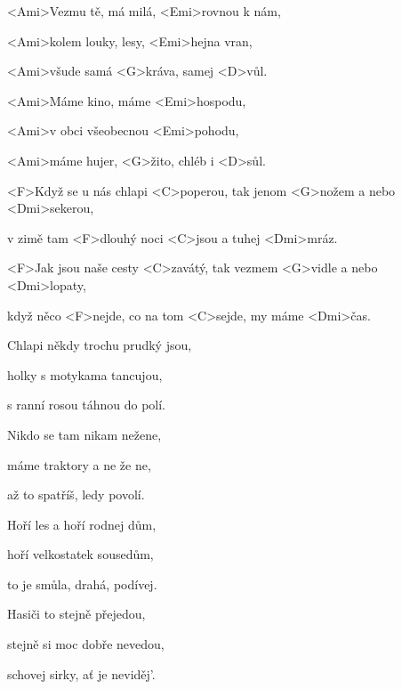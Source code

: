 

\zs
<Ami>Vezmu tě, má milá, <Emi>rovnou k nám,

<Ami>kolem louky, lesy, <Emi>hejna vran,

<Ami>všude samá <G>kráva, samej <D>vůl.

<Ami>Máme kino, máme <Emi>hospodu,

<Ami>v obci všeobecnou <Emi>pohodu,

<Ami>máme hujer, <G>žito, chléb i <D>sůl.
\ks

\zr
<F>Když se u nás chlapi <C>poperou, tak jenom <G>nožem a nebo <Dmi>sekerou,

v zimě tam <F>dlouhý noci <C>jsou a tuhej <Dmi>mráz.

<F>Jak jsou naše cesty <C>zavátý, tak vezmem <G>vidle a nebo <Dmi>lopaty,

když něco <F>nejde, co na tom <C>sejde, my máme <Dmi>čas.
\kr

\zs
Chlapi někdy trochu prudký jsou,

holky s motykama tancujou,

s ranní rosou táhnou do polí.

Nikdo se tam nikam nežene,

máme traktory a ne že ne,

až to spatříš, ledy povolí.
\ks

\zr\kr

\zs
Hoří les a hoří rodnej dům,

hoří velkostatek sousedům,

to je smůla, drahá, podívej.

Hasiči to stejně přejedou,

stejně si moc dobře nevedou,

schovej sirky, ať je neviděj'.
\ks

\zr\kr

\kp
